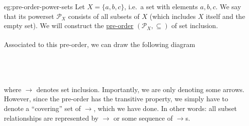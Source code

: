 \begin{eg}{eg:pre-order-power-sets}
    Let \( X = \{ a, b, c \} \), i.e.\ a set with elements \( a, b, c \).
    We say that its powerset \( \mathcal{P}_{X} \) consists of all subsets of \( X \) (which includes \( X \) itself and the empty set).
    We will construct the \hyperref[dfn:pre-order]{pre-order} \( (\mathcal{P}_{X}, \subseteq) \) of set inclusion.
    \\ \\
    Associated to this pre-order, we can draw the following diagram
    \\ \\
    \\ \\
    where \( \longrightarrow \) denotes set inclusion.
    Importantly, we are only denoting some arrows.
    However, since the pre-order has the transitive property, we simply have to denote a ``covering'' set of \( \longrightarrow \), which we have done.
    In other words: all subset relationships are represented by \( \longrightarrow \) or some sequence of \( \longrightarrow \)s.
\end{eg}

